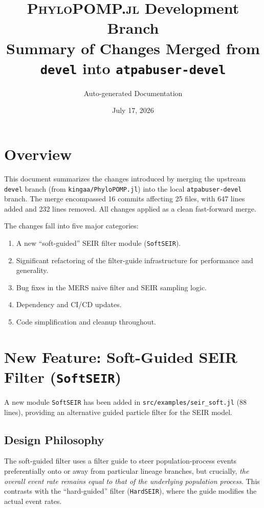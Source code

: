 \documentclass[11pt,letterpaper]{article}
\title{%
  \textsc{PhyloPOMP.jl} Development Branch\\[4pt]
  {\large Summary of Changes Merged from \texttt{devel} into \texttt{atpabuser-devel}}%
}
\author{Auto-generated Documentation}
\date{July 17, 2026}
\begin{document}
\maketitle

\tableofcontents
\vspace{1em}

\section{Overview}

This document summarizes the changes introduced by merging the upstream
\texttt{devel} branch (from \texttt{kingaa/PhyloPOMP.jl}) into the
local \texttt{atpabuser-devel} branch. The merge encompassed 16 commits
affecting 25 files, with 647 lines added and 232 lines removed. All
changes applied as a clean fast-forward merge.

The changes fall into five major categories:

\begin{enumerate}
  \item A new ``soft-guided'' SEIR filter module (\texttt{SoftSEIR}).
  \item Significant refactoring of the filter-guide infrastructure for
        performance and generality.
  \item Bug fixes in the MERS naive filter and SEIR sampling logic.
  \item Dependency and CI/CD updates.
  \item Code simplification and cleanup throughout.
\end{enumerate}

\section{New Feature: Soft-Guided SEIR Filter (\texttt{SoftSEIR})}

A new module \texttt{SoftSEIR} has been added in
\texttt{src/examples/seir\_soft.jl} (88 lines), providing an
alternative guided particle filter for the SEIR model.

\subsection{Design Philosophy}

The soft-guided filter uses a filter guide to steer population-process
events preferentially onto or away from particular lineage branches,
but crucially, \emph{the overall event rate remains equal to that of
the underlying population process}. This contrasts with the
``hard-guided'' filter (\texttt{HardSEIR}), where the guide modifies
the actual event rates.
\end{document}
